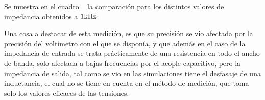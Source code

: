 Se muestra en el cuadro ~ la comparación para los distintos valores de impedancia obtenidos a $1 \si[per-mode=symbol]{\kilo\hertz}$:


\begin{table}[H]  %
    
    \setlength\arrayrulewidth{1.5pt}
    \def\clinecolor{\hhline{|>{\arrayrulecolor{white}}-%
    >{\arrayrulecolor{white}}|-|-|-|-|}}
    
\begin{center}  
    \caption{Comparación de impedancias de entrada y salida (a 1 \si[per-mode=symbol]{\kilo\hertz})}
    \label{tab:comp_impedance}
	\end{center}
\end{table}

Una cosa a destacar de esta medición, es que su precisión se vio afectada por la precisión del voltímetro con el que se disponía, y que además en el caso de la impedancia de entrada se trata prácticamente de una resistencia en todo el ancho de banda, solo afectada a bajas frecuencias por el acople capacitivo, pero la impedancia de salida, tal como se vio en las simulaciones tiene el desfasaje de una inductancia, el cual no se tiene en cuenta en el método de medición, que toma solo los valores eficaces de las tensiones.



